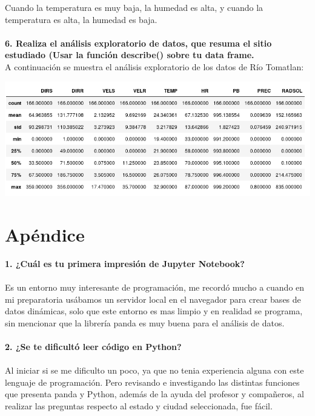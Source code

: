 \documentclass[12pt]{article}
\begin{document}
Cuando la temperatura es muy baja, la humedad es alta, y cuando la temperatura es alta, la humedad es baja. \\ \\

\noindent\textbf {6. Realiza el análisis exploratorio de datos, que resuma el sitio estudiado (Usar la función describe() sobre tu data frame. } \\

A continuación se muestra el análisis exploratorio de los datos de Río Tomatlan:

\begin{center}
\includegraphics[scale=0.6]{Estad1.png}
\end{center}

\section{Apéndice}
\noindent\textbf {1. ¿Cuál es tu primera impresión de Jupyter Notebook?}\\\\
Es un entorno muy interesante de programación, me recordó mucho a cuando en mi preparatoria usábamos un servidor local en el navegador para crear bases de datos dinámicas, solo que este entorno es mas limpio y en realidad se programa, sin mencionar que la librería panda es muy buena para el análisis de datos. \\ \\

\noindent\textbf {2. ¿Se te dificultó leer código en Python?}\\ \\
Al iniciar si se me dificulto un poco, ya que no tenia experiencia alguna con este lenguaje de programación. Pero revisando e investigando las distintas funciones que presenta panda y Python, además de la ayuda del profesor y compañeros, al realizar las preguntas respecto al estado y ciudad seleccionada, fue fácil. \\ \\
\end{document}
